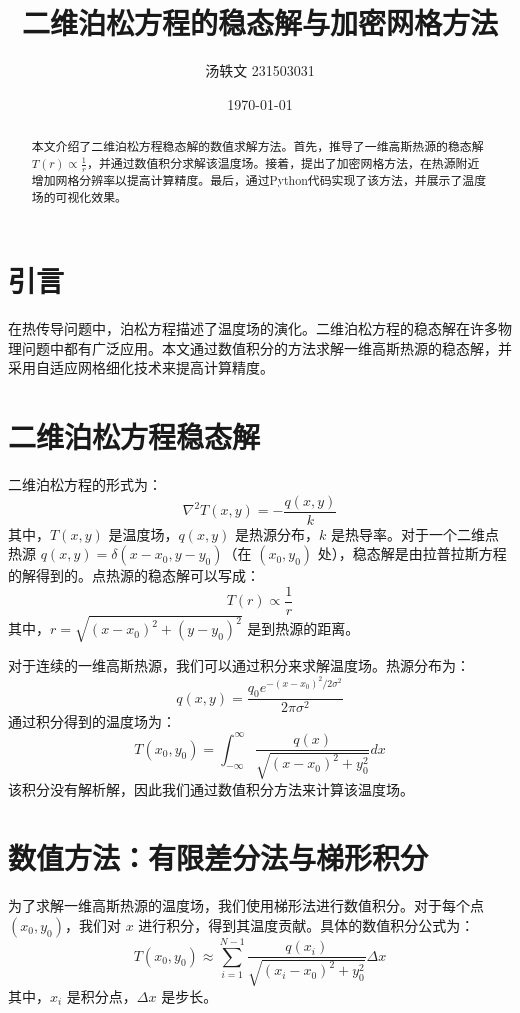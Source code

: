 \documentclass[12pt]{article}
\title{二维泊松方程的稳态解与加密网格方法}
\author{汤轶文 231503031}
\date{\today}
\begin{document}
\maketitle

\begin{abstract}
    本文介绍了二维泊松方程稳态解的数值求解方法。首先，推导了一维高斯热源的稳态解 \( T(r) \propto \frac{1}{r} \)，并通过数值积分求解该温度场。接着，提出了加密网格方法，在热源附近增加网格分辨率以提高计算精度。最后，通过Python代码实现了该方法，并展示了温度场的可视化效果。
    \end{abstract}
    
    \section{引言}
    在热传导问题中，泊松方程描述了温度场的演化。二维泊松方程的稳态解在许多物理问题中都有广泛应用。本文通过数值积分的方法求解一维高斯热源的稳态解，并采用自适应网格细化技术来提高计算精度。
    
    \section{二维泊松方程稳态解}
    二维泊松方程的形式为：
    \[
    \nabla^2 T(x, y) = -\frac{q(x, y)}{k}
    \]
    其中，\( T(x, y) \) 是温度场，\( q(x, y) \) 是热源分布，\( k \) 是热导率。对于一个二维点热源 \( q(x, y) = \delta(x - x_0, y - y_0) \)（在 \( (x_0, y_0) \) 处），稳态解是由拉普拉斯方程的解得到的。点热源的稳态解可以写成：
    \[
    T(r) \propto \frac{1}{r}
    \]
    其中，\( r = \sqrt{(x - x_0)^2 + (y - y_0)^2} \) 是到热源的距离。
    
    对于连续的一维高斯热源，我们可以通过积分来求解温度场。热源分布为：
    \[
    q(x, y) = \frac{q_0 e^{-(x - x_0)^2 / 2\sigma^2}}{2\pi \sigma^2}
    \]
    通过积分得到的温度场为：
    \[
    T(x_0, y_0) = \int_{-\infty}^{\infty} \frac{q(x)}{\sqrt{(x - x_0)^2 + y_0^2}} dx
    \]
    该积分没有解析解，因此我们通过数值积分方法来计算该温度场。
    
    \section{数值方法：有限差分法与梯形积分}
    为了求解一维高斯热源的温度场，我们使用梯形法进行数值积分。对于每个点 \( (x_0, y_0) \)，我们对 \( x \) 进行积分，得到其温度贡献。具体的数值积分公式为：
    \[
    T(x_0, y_0) \approx \sum_{i=1}^{N-1} \frac{q(x_i)}{\sqrt{(x_i - x_0)^2 + y_0^2}} \Delta x
    \]
    其中，\( x_i \) 是积分点，\( \Delta x \) 是步长。
\end{document}

